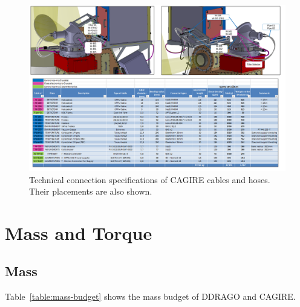 \documentclass{report}
\begin{document}
\begin{figure}
\begin{center}
\includegraphics[width=1.2\linewidth]{figures/DD-Cg-ME-SS-Cabling_Cagire.png}
\end{center}
\caption{Technical connection specifications of CAGIRE cables and hoses. Their placements are also shown.}
\label{figure:DD-CG-candhCAGIRE}
\end{figure}


\chapter{Mass and Torque}

\section{Mass}

Table~\ref{table:mass-budget} shows the mass budget of DDRAGO and CAGIRE.
\end{document}
